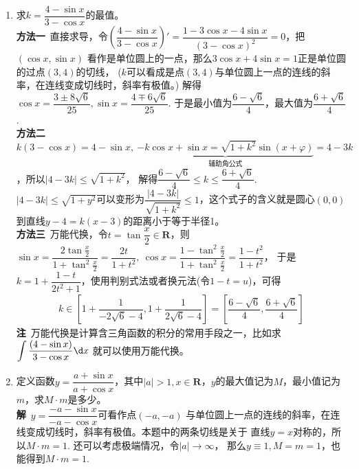 \begin{enumerate}[label={【\textbf{例\thechapter.\arabic*}】},
 leftmargin=\inteval{\myenumleftmargin}pt,
 itemsep=\inteval{\myenumitempsep}pt,
 itemindent=\inteval{\myenumitemindent}pt]
\item \label{分式三角求值域} 求$ k=\dfrac{4-\sin x}{3-\cos x} $的最值。\\
\textbf{方法一}\ 直接求导，令$ \left(\dfrac{4-\sin x}{3-\cos x}\right)'
=\dfrac{1-3\cos x-4\sin x}{(3-\cos x)^2}=0 $，把$ (\cos x,\sin x) $
看作是单位圆上的一点，那么$ 3\cos x+4\sin x=1 $正是单位圆的过点$ (3,4) $的切线，
($ k $可以看成是点$ (3,4) $与单位圆上一点的连线的斜率，在连线变成切线时，斜率有极值。)
解得$ \cos x=\dfrac{3\pm 8\sqrt{6}}{25},\sin x=\dfrac{4\mp 6\sqrt{6}}{25} $. 
于是最小值为$ \dfrac{6-\sqrt{6}}{4} $，最大值为$ \dfrac{6+\sqrt{6}}{4} $. \\
\textbf{方法二}\ $ k(3-\cos x)=4-\sin x,\ \underbrace{-k\cos x +\sin x=
    \sqrt{1+k^2}\sin(x+\varphi)}_{\text{辅助角公式}}=4-3k $，所以$ |4-3k|\leq\sqrt{1+k^2} $，
解得$ \dfrac{6-\sqrt{6}}{4}\leq k \leq \dfrac{6+\sqrt{6}}{4}  $. \\
$ |4-3k|\leq\sqrt{1+y^2} $可以变形为$ \dfrac{|4-3k|}{\sqrt{1+k^2}}
\leq 1 $，这个式子的含义就是圆心$ (0,0) $到直线$ y-4=k(x-3) $的距离小于等于半径1。\\
\textbf{方法三}\ 万能代换，令$ t=\tan\dfrac{x}{2}\in \textbf{R} $，则$ \sin x=
\dfrac{2\tan\frac{x}{2}}{1+\tan^2\frac{x}{2}}=\dfrac{2t}{1+t^2},\ \cos x=\dfrac{1-\tan^2\frac{x}{2}}{1+\tan^2\frac{x}{2}}=\dfrac{1-t^2}{1+t^2} $，
于是$ k=1+\dfrac{1-t}{2t^2+1} $，使用判别式法或者换元法(令$ 1-t=u $)，可得
\begin{gather*}
    k\in \left[1+\dfrac{1}{-2\sqrt{6}-4}, 
    1+\dfrac{1}{2\sqrt{6}-4} \right]=\left[\dfrac{6-\sqrt{6}}{4},
    \dfrac{6+\sqrt{6}}{4}\right]
\end{gather*}
\textbf{注}\ 万能代换是计算含三角函数的积分的常用手段之一，比如求
$ \displaystyle{ \int\dfrac{(4-\sin x)}{3-\cos x}\d x } $
就可以使用万能代换。

\item 定义函数$ y=\dfrac{a+\sin x}{a+\cos x} $，其中$ |a|>1,x\in 
\textbf{R} $，$ y $的最大值记为$ M $，最小值记为$ m $，求$ M\cdot m $是多少。\\
\textbf{解}\ $ y=\dfrac{-a-\sin x}{-a-\cos x} $可看作点$ (-a,-a) $
与单位圆上一点的连线的斜率，在连线变成切线时，斜率有极值。本题中的两条切线是关于
直线$ y=x $对称的，所以$ M\cdot m=1 $. 还可以考虑极端情况，令$ |a|\to\infty $，
那么$ y\equiv 1,M=m=1 $，也能得到$ M\cdot m=1 $. 


\end{enumerate}
